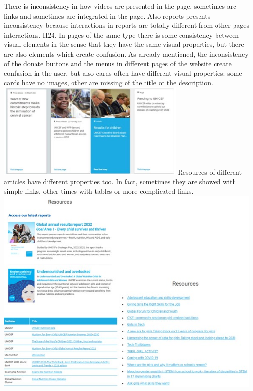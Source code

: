 \newline There is inconsistency in how videos are presented in the page, sometimes are links and sometimes are integrated in the page.
\newline Also reports presents inconsistency because interactions in reports are totally different from other pages interactions.
\newline
\newline H24.	In pages of the same type there is some consistency between visual elements in the sense that they have the same visual properties, but there are also elements which create confusion.
\newline As already mentioned, the inconsistency of the donate buttons and the menus in different pages of the website create confusion in the user, but also cards often have different visual properties: some cards have no images, other are missing of the title or the description.
\newline \includegraphics[width=0.7\textwidth]{FinalScores28.jpg}
\newline Resources of different articles have different properties too. In fact, sometimes they are showed with simple links, other times with tables or more complicated links.
\newline \includegraphics[width=\textwidth]{FinalScores29.jpg}
